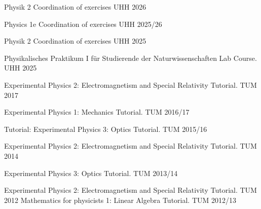 
\begin{cvhonors}
  \cvhonor
    {Physik 2} %
    {Coordination of exercises} %
    {UHH} %
    {2026} %

  \cvhonor
    {Physics 1e} %
    {Coordination of exercises} %
    {UHH} %
    {2025/26} %

  \cvhonor
    {Physik 2} %
    {Coordination of exercises} %
    {UHH} %
    {2025} %

  \cvhonor
    {Physikalisches Praktikum I für Studierende der Naturwissenschaften} %
    {Lab Course.} %
    {UHH} %
    {2025} %

  \cvhonor
    {Experimental Physics 2: Electromagnetism and Special Relativity} %
    {Tutorial.} %
    {TUM} %
    {2017} %

  \cvhonor
    {Experimental Physics 1: Mechanics} %
    {Tutorial.} %
    {TUM} %
    {2016/17} %

  \cvhonor
    {Tutorial: Experimental Physics 3: Optics} %
    {Tutorial.} %
    {TUM} %
    {2015/16} %

  \cvhonor
    {Experimental Physics 2: Electromagnetism and Special Relativity} %
    {Tutorial.} %
    {TUM} %
    {2014} %

  \cvhonor
    {Experimental Physics 3: Optics} %
    {Tutorial.} %
    {TUM} %
    {2013/14} %

  \cvhonor
    {Experimental Physics 2: Electromagnetism and Special Relativity} %
    {Tutorial.} %
    {TUM} %
    {2012} %
  \cvhonor
    {Mathematics for physicists 1: Linear Algebra} %
    {Tutorial.} %
    {TUM} %
    {2012/13} %


\end{cvhonors}
